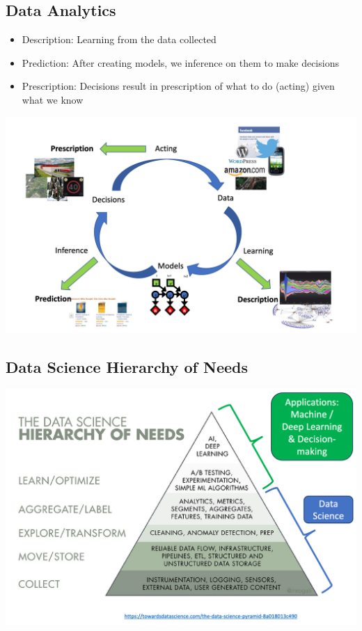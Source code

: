 \documentclass[11pt]{article}
\theoremstyle{definition}
\begin{document}
\subsection{Data Analytics}
\begin{itemize}
  \item Description: Learning from the data collected
  \item Prediction: After creating models, we inference on them to make decisions
  \item Prescription: Decisions result in prescription of what to do (acting) given what we know
\end{itemize}
\includegraphics[width=\textwidth/2]{2.png}
\subsection{Data Science Hierarchy of Needs}
\includegraphics[width=\textwidth/2]{3.png}
\end{document}
